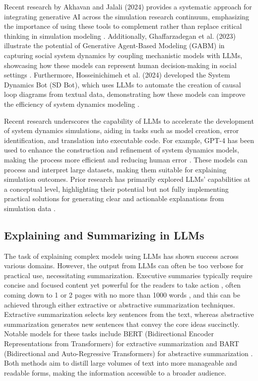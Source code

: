 \documentclass[preprint,12pt]{elsarticle}
\begin{document}
Recent research by Akhavan and Jalali (2024) provides a systematic approach for integrating generative AI across the simulation research continuum, emphasizing the importance of using these tools to complement rather than replace critical thinking in simulation modeling \cite{Akhavan2024}. Additionally, Ghaffarzadegan et al. (2023) illustrate the potential of Generative Agent-Based Modeling (GABM) in capturing social system dynamics by coupling mechanistic models with LLMs, showcasing how these models can represent human decision-making in social settings \cite{Ghaffarzadegan2023}. Furthermore, Hosseinichimeh et al. (2024) developed the System Dynamics Bot (SD Bot), which uses LLMs to automate the creation of causal loop diagrams from textual data, demonstrating how these models can improve the efficiency of system dynamics modeling \cite{Hosseinichimeh2024}.

Recent research underscores the capability of LLMs to accelerate the development of system dynamics simulations, aiding in tasks such as model creation, error identification, and translation into executable code. For example, GPT-4 has been used to enhance the construction and refinement of system dynamics models, making the process more efficient and reducing human error \cite{duPlooy2023}. These models can process and interpret large datasets, making them suitable for explaining simulation outcomes. Prior research has primarily explored LLMs' capabilities at a conceptual level, highlighting their potential but not fully implementing practical solutions for generating clear and actionable explanations from simulation data \cite{Giabbanelli2024}.

\subsection{Explaining and Summarizing in LLMs}

The task of explaining complex models using LLMs has shown success across various domains. However, the output from LLMs can often be too verbose for practical use, necessitating summarization. Executive summaries typically require concise and focused content yet powerful for the readers to take action \cite{Kho2022}, often coming down to 1 or 2 pages with no more than 1000 words \cite{Brodsky2018}, and this can be achieved through either extractive or abstractive summarization techniques. Extractive summarization selects key sentences from the text, whereas abstractive summarization generates new sentences that convey the core ideas succinctly. Notable models for these tasks include BERT (Bidirectional Encoder Representations from Transformers) \cite{AbdelSalam2022} for extractive summarization and BART (Bidirectional and Auto-Regressive Transformers) for abstractive summarization \cite{Lewis2020}. Both methods aim to distill large volumes of text into more manageable and readable forms, making the information accessible to a broader audience.\\
\end{document}
